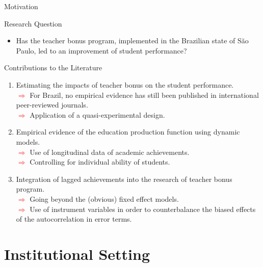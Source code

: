\documentclass{beamer}
\begin{document}
\begin{frame} {Motivation}
\begin{block}{\centering Research Question}
  		\begin{itemize}
			\item Has the teacher bonus program, implemented in the Brazilian state of São Paulo, led to an improvement of student performance?
			\end{itemize}
\end{block}


\vspace{1cm}

\begin{block}{\centering Contributions to the Literature}
\begin{enumerate}
\item \footnotesize Estimating the impacts of teacher bonus on the student performance.
\\ \tiny\textcolor{red}{$\Longrightarrow$} For Brazil, no empirical evidence has still been published in international peer-reviewed journals.
\\ \tiny\textcolor{red}{$\Longrightarrow$} Application of a quasi-experimental design.
\hfill \break 
\item \footnotesize Empirical evidence of the education production function using dynamic models.
\\ \tiny\textcolor{red}{$\Longrightarrow$} Use of longitudinal data of academic achievements.
\\ \tiny\textcolor{red}{$\Longrightarrow$} Controlling for individual ability of students.	
\hfill \break 
\item \footnotesize Integration of lagged achievements into the research of teacher bonus program.
\\ \tiny\textcolor{red}{$\Longrightarrow$} Going beyond the (obvious) fixed effect models.
\\ \tiny\textcolor{red}{$\Longrightarrow$} Use of instrument variables in order to counterbalance the biased effects of the autocorrelation in error terms.	
\end{enumerate}
\end{block}
\end{frame}




\section{Institutional Setting}
\end{document}
